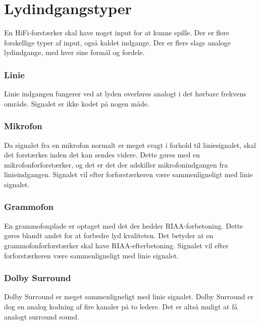\section{Lydindgangstyper}
\label{indgange}
En HiFi-forstærker skal have noget input for at kunne spille. Der er flere forskellige typer af input, også kaldet indgange. Der er flere slags analoge lydindgange, med hver sine formål og fordele.

\subsubsection{Linie}
Linie indgangen fungerer ved at lyden overføres analogt i det hørbare frekvens område. Signalet er ikke kodet på nogen måde. 

\subsubsection{Mikrofon}
Da signalet fra en mikrofon normalt er meget svagt i forhold til liniesignalet, skal det forstærkes inden det kan sendes videre. Dette gøres med en mikrofonforforstærker, og det er det der adskiller mikrofonindgangen fra linieindgangen. Signalet vil efter forforstærkeren være sammenligneligt med linie signalet.

\subsubsection{Grammofon}
En grammofonplade er optaget med det der hedder RIAA-forbetoning. Dette gøres blandt andet for at forbedre lyd kvaliteten. Det betyder at en grammofonforforstærker skal have RIAA-efterbetoning. Signalet vil efter forforstærkeren være sammenligneligt med linie signalet. 

\subsubsection{Dolby Surround}
Dolby Surround er meget sammenligneligt med linie signalet. Dolby Surround er dog en analog kodning af fire kanaler på to ledere. Det er altså muligt at få analogt surround sound. 


